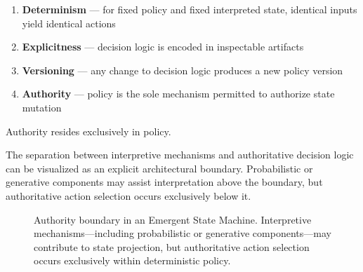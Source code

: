 \documentclass[11pt]{article}
\begin{document}
\begin{enumerate}
  \item \textbf{Determinism} — for fixed policy and fixed interpreted state, identical inputs yield identical actions
  \item \textbf{Explicitness} — decision logic is encoded in inspectable artifacts
  \item \textbf{Versioning} — any change to decision logic produces a new policy version
  \item \textbf{Authority} — policy is the sole mechanism permitted to authorize state mutation
\end{enumerate}

Authority resides exclusively in policy.


The separation between interpretive mechanisms and authoritative decision logic can be visualized as an explicit architectural boundary. Probabilistic or generative components may assist interpretation above the boundary, but authoritative action selection occurs exclusively below it.

\begin{figure}[H]
\centering
{}

\caption{Authority boundary in an Emergent State Machine. 
Interpretive mechanisms—including probabilistic or generative components—may contribute to state projection, but authoritative action selection occurs exclusively within deterministic policy.}
\end{figure}
\end{document}
